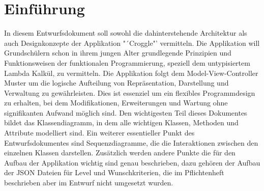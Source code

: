\chapter{Einführung}

In diesem Entwurfsdokument soll sowohl die dahinterstehende Architektur als auch Designkonzepte der Applikation "´Croggle"' vermitteln.
Die Applikation will Grundschülern schon in ihrem jungen Alter grundlegende Prinzipien und Funktionsweisen der funktionalen Programmierung, speziell dem untypisiertem Lambda Kalkül, zu vermitteln. Die Applikation folgt dem Model-View-Controller Muster um die logische Aufteilung von Repräsentation, Darstellung und Verwaltung zu gewährleisten. Dies ist essenziel um ein flexibles Programmdesign zu erhalten, bei dem Modifikationen, Erweiterungen und Wartung ohne signifikanten Aufwand möglich sind. Den wichtigesten Teil dieses Dokumentes bildet das Klassendiagramm, in dem alle wichtigen Klassen, Methoden und Attribute modelliert sind. Ein weiterer essentieller Punkt des Entwurfsdokumentes sind Sequenzdiagramme, die die Interaktionen zwischen den einzelnen Klassen darstellen. Zusätzlich werden andere 
Punkte die für den Aufbau der Applikation wichtig sind genau beschrieben, dazu gehören der Aufbau der JSON Dateien für Level und Wunschkriterien, die im Pflichtenheft beschrieben aber im Entwurf nicht umgesetzt wurden.
